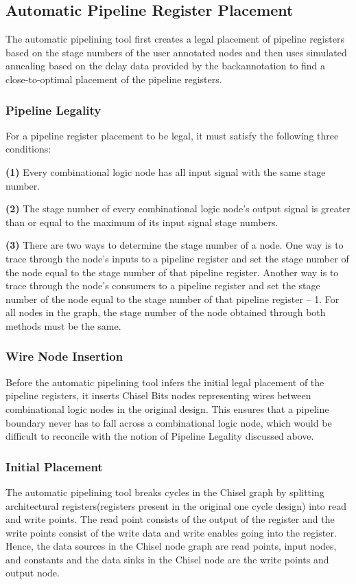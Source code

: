 \subsection{Automatic Pipeline Register Placement}
The automatic pipelining tool first creates a legal placement of pipeline registers based on the stage numbers of the user annotated nodes and then uses simulated annealing based on the delay data provided by the backannotation to find a close-to-optimal placement of the pipeline registers. 

\subsubsection{Pipeline Legality}
For a pipeline register placement to be legal, it must satisfy the following three conditions:

{\bf (1)} Every combinational logic node has all input signal with the same stage number.  

{\bf (2)} The stage number of every combinational logic node's output signal is greater than or equal to the maximum of its input signal stage numbers. 

{\bf (3)} There are two ways to determine the stage number of a node. One way is to trace through the node's inputs to a pipeline register and set the stage number of the node equal to the stage number of that pipeline register. Another way is to trace through the node’s consumers to a pipeline register and set the stage number of the node equal to the stage number of that pipeline register – 1. For all nodes in the graph, the stage number of the node obtained through both methods must be the same.

\subsubsection{Wire Node Insertion}
\label{wiresection}
Before the automatic pipelining tool infers the initial legal placement of the pipeline registers, it inserts Chisel Bits nodes representing wires between combinational logic nodes in the original design. This ensures that a pipeline boundary never has to fall across a combinational logic node, which would be difficult to reconcile with the notion of Pipeline Legality discussed above.
\subsubsection{Initial Placement}
The automatic pipelining tool breaks cycles in the Chisel graph by splitting architectural registers(registers present in the original one cycle design) into read and write points. The read point consists of the output of the register and the write points consist of the write data and write enables going into the register. Hence, the data sources in the Chisel node graph are read points, input nodes, and constants and the data sinks in the Chisel node are the write points and output node.


